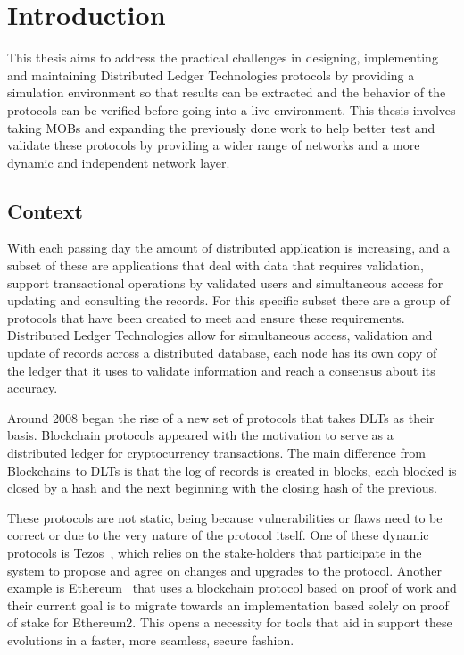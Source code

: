 
%

\chapter{Introduction}\label{cha:introduction}

This thesis aims to address the practical challenges in designing, implementing and maintaining Distributed
Ledger Technologies protocols by providing a simulation environment so that results can be extracted and the behavior 
of the protocols can be verified before going into a live environment. This thesis involves taking MOBs and expanding
the previously done work to help better test and validate these protocols by providing a wider range of networks and
a more dynamic and independent network layer.


\section{Context}\label{sub:context}
With each passing day the amount of distributed application is increasing, and a subset of these are applications that
deal with data that requires validation, support transactional operations by validated users and simultaneous access for updating and
consulting the records. For this specific subset there are a group of protocols that have been created to meet and ensure
these requirements. Distributed Ledger Technologies allow for simultaneous access, validation and update of records across
a distributed database, each node has its own copy of the ledger that it uses to validate information and reach a consensus
about its accuracy.

Around 2008 began the rise of a new set of protocols that takes DLTs as their basis. Blockchain protocols appeared with the motivation
to serve as a distributed ledger for cryptocurrency transactions. The main difference from Blockchains to DLTs is that
the log of records is created in blocks, each blocked is closed by a hash and the next beginning with the closing hash of the previous.

These protocols are not static, being because vulnerabilities or flaws need to be correct or due to the very nature of the protocol itself.
One of these dynamic protocols is Tezos~\cite{tezos}, which relies on the stake-holders that participate in the system to propose and
agree on changes and upgrades to the protocol. Another example is Ethereum~\cite{ethereum} that uses a blockchain protocol based on proof
of work and their current goal is to migrate towards an implementation based solely on proof of stake for Ethereum2.
This opens a necessity for tools that aid in support these evolutions in a faster, more seamless, secure fashion.

